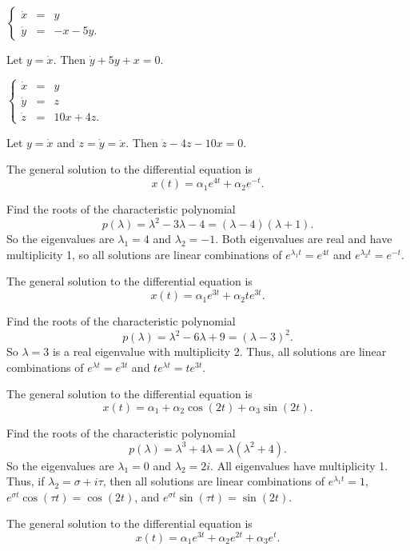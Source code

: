 \documentclass{ximera}
\begin{document}
 \ans $\left\{\begin{array}{rcl} \dot{x} & = & y \\
\dot{y} & = & -x-5y. \end{array}\right.$

\soln  Let $y = \dot{x}$.  Then $\dot{y}+5y+x=0$.

 \ans $\left\{\begin{array}{rcl} \dot{x} & = & y \\
\dot{y} & = & z\\
\dot{z} & = & 10x+4z. \end{array}\right.$

\soln  Let $y = \dot{x}$ and $z=\dot{y}=\ddot{x}$.  Then 
$\dot{z}-4z-10x=0$.

\newpage
{} \ans The general solution to the differential equation is
\[
x(t) = \alpha_1e^{4t} + \alpha_2e^{-t}.
\]

\soln Find the roots of the characteristic polynomial
\[
p(\lambda) = \lambda^2 - 3\lambda - 4 = (\lambda - 4)(\lambda + 1).
\]
So the eigenvalues are $\lambda_1 = 4$ and $\lambda_2 = -1$.  Both eigenvalues
are real and have multiplicity 1, so all solutions are linear combinations of
$e^{\lambda_1 t} = e^{4t}$ and $e^{\lambda_2 t} = e^{-t}$.

 \ans The general solution to the differential equation is
\[
x(t) = \alpha_1e^{3t} + \alpha_2te^{3t}.
\]

\soln Find the roots of the characteristic polynomial
\[
p(\lambda) = \lambda^2 - 6\lambda + 9 = (\lambda - 3)^2.
\]
So $\lambda = 3$ is a real eigenvalue with multiplicity 2.  Thus, all
solutions are linear combinations of $e^{\lambda t} = e^{3t}$ and
$te^{\lambda t} = te^{3t}$.

 \ans The general solution to the differential equation is
\[
x(t) = \alpha_1 + \alpha_2\cos(2t) + \alpha_3\sin(2t).
\]

\soln Find the roots of the characteristic polynomial
\[
p(\lambda) = \lambda^3 + 4\lambda = \lambda(\lambda^2 + 4).
\]
So the eigenvalues are $\lambda_1 = 0$ and $\lambda_2 = 2i$.  All
eigenvalues have multiplicity 1.  Thus, if $\lambda_2 = \sigma + i\tau$, then
all solutions are linear combinations of $e^{\lambda_1 t} = 1$,
$e^{\sigma t}\cos(\tau t) = \cos(2t)$, and $e^{\sigma t}\sin(\tau t)
= \sin(2t)$.

 \ans The general solution to the differential equation is
\[
x(t) = \alpha_1e^{3t} + \alpha_2e^{2t} + \alpha_3e^t.
\]
\end{document}
